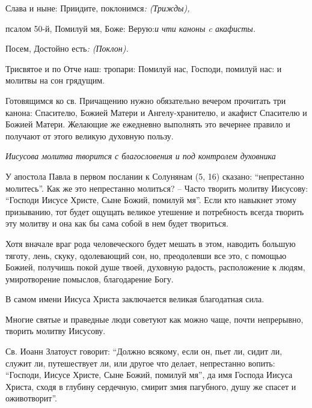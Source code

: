 Слава и ныне: Приидите, поклонимся\itshape : (Трижды\normalfont{}), 

псалом 50-й, Помилуй мя, Боже: Верую:\itshape  и чти каноны c акафисты.






\normalfont{}


\bfseries 


Посем\normalfont{}, Достойно есть\itshape : (Поклон\normalfont{}). 

Трисвятое и по Отче наш: тропари: Помилуй нас, Господи, помилуй нас: и молитвы на сон грядущим. 






\itshape 


Готовящимся ко св. Причащению нужно обязательно вечером прочитать три канона: Спасителю, Божией Матери и Ангелу-хранителю, и акафист Спасителю и Божией Матери. Желающие же ежедневно выполнять это вечернее правило и получают от этого великую духовную пользу.

 

\normalfont{}


\mychapterending

 


\itshape * Иисусова молитва творится с благословения и под контролем духовника\normalfont{}






У апостола Павла в первом послании к Солунянам (5, 16) сказано: “непрестанно молитесь”. Как же это непрестанно молиться? – Часто творить молитву Иисусову: “Господи Иисусе Христе, Сыне Божий, помилуй мя”. Если кто навыкнет этому призыванию, тот будет ощущать великое утешение и потребность всегда творить эту молитву и она как бы сама собой в нем будет твориться. 

Хотя вначале враг рода человеческого будет мешать в этом, наводить большую тяготу, лень, скуку, одолевающий сон, но, преодолевши все это, с помощью Божией, получишь покой душе твоей, духовную радость, расположение к людям, умиротворение помыслов, благодарение Богу. 

В самом имени Иисуса Христа заключается великая благодатная сила. 

Многие святые и праведные люди советуют как можно чаще, почти непрерывно, творить молитву Иисусову. 

Св. Иоанн Златоуст говорит: “Должно всякому, если он, пьет ли, сидит ли, служит ли, путешествует ли, или другое что делает, непрестанно вопить: “Господи, Иисусе Христе, Сыне Божий, помилуй мя”, да имя Господа Иисуса Христа, сходя в глубину сердечную, смирит змия пагубного, душу же спасет и оживотворит”. 

